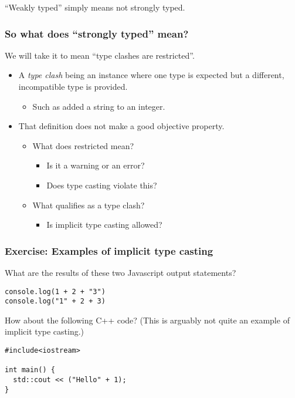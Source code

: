 \documentclass[11pt]{article}
\theoremstyle{definition}
\begin{document}
“Weakly typed” simply means not strongly typed.

\subsubsection{So what does “strongly typed” mean?}
\label{sec:orgae2d5b6}

We will take it to mean “type clashes are restricted”.
\begin{itemize}
\item A \emph{type clash} being an instance where one type is expected
but a different, incompatible type is provided.
\begin{itemize}
\item Such as added a string to an integer.
\end{itemize}
\item That definition does not make a good objective property.
\begin{itemize}
\item What does restricted mean?
\begin{itemize}
\item Is it a warning or an error?
\item Does type casting violate this?
\end{itemize}
\item What qualifies as a type clash?
\begin{itemize}
\item Is implicit type casting allowed?
\end{itemize}
\end{itemize}
\end{itemize}

\subsubsection{Exercise: Examples of implicit type casting}
\label{sec:org4cc82f1}

What are the results of these two Javascript output statements?
\begin{verbatim}
console.log(1 + 2 + "3")
console.log("1" + 2 + 3)
\end{verbatim}

How about the following C++ code?
(This is arguably not quite an example of implicit type casting.)
\begin{verbatim}
#include<iostream>

int main() {
  std::cout << ("Hello" + 1);
}
\end{verbatim}
\end{document}
